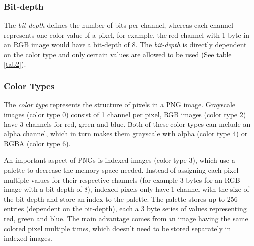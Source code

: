 \documentclass[runningheads]{llncs}
\begin{document}
\subsubsection{Bit-depth}
The \textit{bit-depth} defines the number of bits per channel, whereas each channel represents one color value of a pixel, for example, the red channel with 1 byte in an RGB image would have a bit-depth of 8.
The \textit{bit-depth} is directly dependent on the color type and only certain values are allowed to be used (See table \ref{tab2}).

\subsubsection{Color Types}
The \textit{color type} represents the structure of pixels in a PNG image. Grayscale images (color type 0) consist of 1 channel per pixel, RGB images (color type 2) have 3 channels for red, green and blue. 
Both of these color types can include an alpha channel, which in turn makes them grayscale with alpha (color type 4) or RGBA (color type 6).

An important aspect of PNGs is indexed images (color type 3), which use a palette to decrease the memory space needed.
Instead of assigning each pixel multiple values for their respective channels (for example 3-bytes for an RGB image with a bit-depth of 8), indexed pixels only have 1 channel with the size of the bit-depth and store an index to the palette.
The palette stores up to 256 entries (dependent on the bit-depth), each a 3 byte series of values representing red, green and blue. The main advantage comes from an image having the same colored pixel multiple times, which doesn't need to be stored separately in indexed images.
\end{document}
